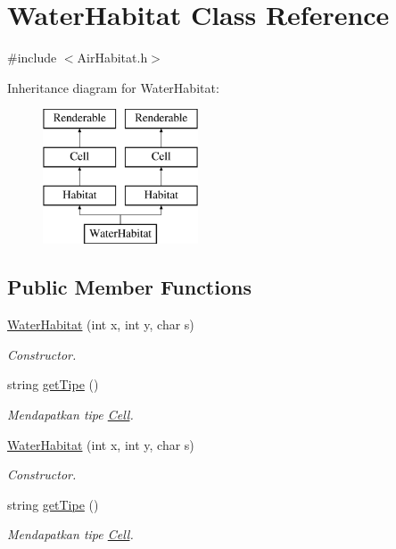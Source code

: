 \hypertarget{classWaterHabitat}{\section{Water\-Habitat Class Reference}
\label{classWaterHabitat}
}


{\ttfamily \#include $<$Air\-Habitat.\-h$>$}

Inheritance diagram for Water\-Habitat\-:\begin{figure}[H]
\begin{center}
\leavevmode
\includegraphics[height=4.000000cm]{classWaterHabitat}
\end{center}
\end{figure}
\subsection*{Public Member Functions}
\begin{DoxyCompactItemize}
\item 
\hyperlink{classWaterHabitat_a0e4b21bb7912f199945b5533457dbdcf}{Water\-Habitat} (int x, int y, char s)
\begin{DoxyCompactList}\small\item\em Constructor. \end{DoxyCompactList}\item 
string \hyperlink{classWaterHabitat_a02b4e524ab689f2e2b54b74acb58f7b2}{get\-Tipe} ()
\begin{DoxyCompactList}\small\item\em Mendapatkan tipe \hyperlink{classCell}{Cell}. \end{DoxyCompactList}\item 
\hyperlink{classWaterHabitat_a0e4b21bb7912f199945b5533457dbdcf}{Water\-Habitat} (int x, int y, char s)
\begin{DoxyCompactList}\small\item\em Constructor. \end{DoxyCompactList}\item 
string \hyperlink{classWaterHabitat_a02b4e524ab689f2e2b54b74acb58f7b2}{get\-Tipe} ()
\begin{DoxyCompactList}\small\item\em Mendapatkan tipe \hyperlink{classCell}{Cell}. \end{DoxyCompactList}\end{DoxyCompactItemize}


